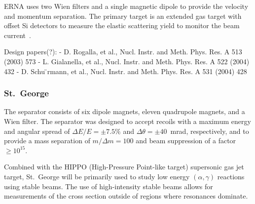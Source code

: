 ERNA uses two Wien filters and a single magnetic dipole to provide the velocity
and momentum separation. The primary target is an extended gas target with
offset Si detectors to measure the elastic scattering yield to monitor the
beam current~\cite{DiLeva2008}.

Design papers(?):
- D. Rogalla, et al., Nucl. Instr. and Meth. Phys. Res. A 513 (2003) 573
- L. Gialanella, et al., Nucl. Instr. and Meth. Phys. Res. A 522 (2004) 432
- D. Schu ̈rmann, et al., Nucl. Instr. and Meth. Phys. Res. A 531 (2004) 428

\subsubsection{St.\ George}
The separator consists of six dipole magnets, eleven quadrupole magnets, and a
Wien filter. The separator was designed to accept recoils with a maximum
energy and angular spread of $\Delta E/E = \pm7.5\%$ and
$\Delta\theta = \pm40$~mrad, respectively, and to provide a mass separation
of $m/\Delta m = 100$ and beam suppression of a factor $\geq 10^{15}$.

Combined with the HIPPO (High-Pressure Point-like target) supersonic gas jet
target, St.\ George will be primarily used to study low energy
$(\alpha,\gamma)$ reactions using stable beams. The use of high-intensity
stable beams allows for measurements of the cross section outside of regions
where resonances dominate.
